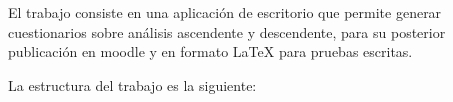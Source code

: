 
El trabajo consiste en una aplicación de escritorio que permite generar cuestionarios sobre análisis ascendente y descendente, para su posterior publicación en moodle y en formato LaTeX para pruebas escritas.

La estructura del trabajo es la siguiente:








